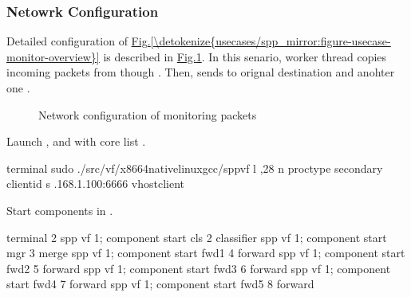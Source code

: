\documentclass[a4paper,11pt,openany,oneside,english]{sphinxmanual}
\begin{document}
\subsubsection{Netowrk Configuration}
\label{\detokenize{usecases/spp_mirror:netowrk-configuration}}
Detailed configuration of \hyperref[\detokenize{usecases/spp_mirror:figure-usecase-monitor-overview}]{Fig.\@ \ref{\detokenize{usecases/spp_mirror:figure-usecase-monitor-overview}}}
is described in \hyperref[\detokenize{usecases/spp_mirror:figure-usecase-monitor-nwconfig}]{Fig.\@ \ref{\detokenize{usecases/spp_mirror:figure-usecase-monitor-nwconfig}}}.
In this senario, worker thread  copies incoming packets
from though .
Then, sends to orignal destination  and anohter one .

\begin{figure}[htbp]
\centering
\capstart

\noindent{}
\caption{Network configuration of monitoring packets}\label{\detokenize{usecases/spp_mirror:id6}}\label{\detokenize{usecases/spp_mirror:figure-usecase-monitor-nwconfig}}\end{figure}

Launch ,  and  with core list .

\begin{sphinxVerbatim}[commandchars=\\\{\},formatcom=\footnotesize]
 terminal 
 sudo ./src/vf/x86\PYGZus{}64\PYGZhy{}native\PYGZhy{}linux\PYGZhy{}gcc/spp\PYGZus{}vf 
    \PYGZhy{}l ,2\PYGZhy{}8 
    \PYGZhy{}n  \PYGZhy{}\PYGZhy{}proc\PYGZhy{}type secondary 
    \PYGZhy{}\PYGZhy{} 
    \PYGZhy{}\PYGZhy{}client\PYGZhy{}id  
    \PYGZhy{}s .168.1.100:6666 
    \PYGZhy{}\PYGZhy{}vhost\PYGZhy{}client
\end{sphinxVerbatim}

Start components in .

\begin{sphinxVerbatim}[commandchars=\\\{\},formatcom=\footnotesize]
\PYGZsh{} terminal 2
spp \PYGZgt{} vf 1; component start cls 2 classifier
spp \PYGZgt{} vf 1; component start mgr 3 merge
spp \PYGZgt{} vf 1; component start fwd1 4 forward
spp \PYGZgt{} vf 1; component start fwd2 5 forward
spp \PYGZgt{} vf 1; component start fwd3 6 forward
spp \PYGZgt{} vf 1; component start fwd4 7 forward
spp \PYGZgt{} vf 1; component start fwd5 8 forward
\end{sphinxVerbatim}
\end{document}
